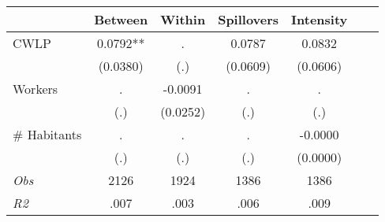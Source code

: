\begin{tabular}{l*{6}{c}}\hline&\multicolumn{1}{c}{Between}&\multicolumn{1}{c}{Within}&\multicolumn{1}{c}{Spillovers}&\multicolumn{1}{c}{Intensity}\\ \hline 
CWLP & 0.0792** & . & 0.0787 & 0.0832 \\
 & (0.0380) & (.) & (0.0609) & (0.0606) \\
Workers & . & -0.0091 & . & . \\
 & (.) & (0.0252) & (.) & (.) \\
\# Habitants & . & . & . & -0.0000 \\
  & (.) & (.) & (.) & (0.0000) \\
\hline \textit{Obs} & 2126 & 1924 & 1386 & 1386  \\ \textit{R2} & .007 & .003 & .006 & .009 \\ \hline \end{tabular}
